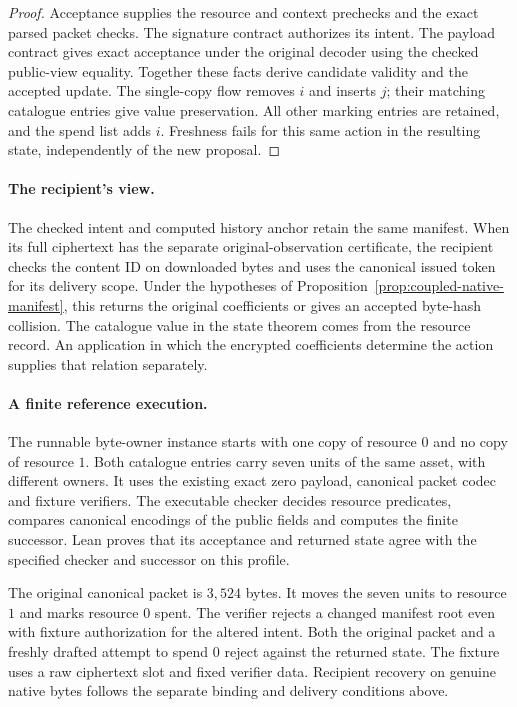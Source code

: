 \begin{proof}
Acceptance supplies the resource and context prechecks and the exact parsed
packet checks. The signature contract authorizes its intent. The payload
contract gives exact acceptance under the original decoder using the checked
public-view equality. Together these facts derive candidate validity and
the accepted update. The single-copy flow removes \(i\) and inserts \(j\);
their matching catalogue entries give value preservation. All other
marking entries are retained, and the spend list adds \(i\). Freshness fails
for this same action in the resulting state, independently of the new
proposal.
\end{proof}

\paragraph{The recipient's view.}
The checked intent and computed history anchor retain the same manifest.
When its full ciphertext has the separate original-observation certificate,
the recipient checks the content ID on downloaded bytes and uses the
canonical issued token for its delivery scope. Under the hypotheses of
Proposition~\ref{prop:coupled-native-manifest}, this returns the original
coefficients or gives an accepted byte-hash collision. The catalogue value
in the state theorem comes from the resource record. An application in
which the encrypted coefficients determine the action supplies that
relation separately.

\paragraph{A finite reference execution.}
The runnable byte-owner instance starts with one copy of resource \(0\) and
no copy of resource \(1\). Both catalogue entries carry seven units of the
same asset, with different owners. It uses the existing exact zero payload,
canonical packet codec and fixture verifiers. The executable checker decides
resource predicates, compares canonical encodings of the public fields and
computes the finite successor. Lean proves that its acceptance and returned
state agree with the specified checker and successor on this profile.

The original canonical packet is \(3{,}524\) bytes. It moves the seven units
to resource \(1\) and marks resource \(0\) spent. The verifier rejects a
changed manifest root even with fixture authorization for the altered
intent. Both the original
packet and a freshly drafted attempt to spend \(0\) reject against the
returned state. The fixture uses a raw ciphertext slot and fixed verifier
data. Recipient recovery on genuine native bytes follows the separate
binding and delivery conditions above.
